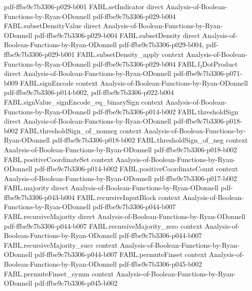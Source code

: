 \begin{theorem}
  {pdf-ffbe9c7b3306-p029-b001}
\proofstep
  {FABL.setIndicator}
  {direct}
  {Analysis-of-Boolean-Functions-by-Ryan-ODonnell}
  {pdf-ffbe9c7b3306-p029-b004}
\proofstep
  {FABL.subsetDensityValue}
  {direct}
  {Analysis-of-Boolean-Functions-by-Ryan-ODonnell}
  {pdf-ffbe9c7b3306-p029-b004}
\proofstep
  {FABL.subsetDensity}
  {direct}
  {Analysis-of-Boolean-Functions-by-Ryan-ODonnell}
  {pdf-ffbe9c7b3306-p029-b004,
    pdf-ffbe9c7b3306-p029-b001}
\proofstep
  {FABL.subsetDensity_apply}
  {context}
  {Analysis-of-Boolean-Functions-by-Ryan-ODonnell}
  {pdf-ffbe9c7b3306-p029-b004}
\proofstep
  {FABL.f₂DotProduct}
  {direct}
  {Analysis-of-Boolean-Functions-by-Ryan-ODonnell}
  {pdf-ffbe9c7b3306-p071-b009}
\proofstep
  {FABL.signEncode}
  {context}
  {Analysis-of-Boolean-Functions-by-Ryan-ODonnell}
  {pdf-ffbe9c7b3306-p014-b002,
    pdf-ffbe9c7b3306-p022-b004}
\proofstep
  {FABL.signValue_signEncode_eq_binarySign}
  {context}
  {Analysis-of-Boolean-Functions-by-Ryan-ODonnell}
  {pdf-ffbe9c7b3306-p014-b002}
\proofstep
  {FABL.thresholdSign}
  {direct}
  {Analysis-of-Boolean-Functions-by-Ryan-ODonnell}
  {pdf-ffbe9c7b3306-p018-b002}
\proofstep
  {FABL.thresholdSign_of_nonneg}
  {context}
  {Analysis-of-Boolean-Functions-by-Ryan-ODonnell}
  {pdf-ffbe9c7b3306-p018-b002}
\proofstep
  {FABL.thresholdSign_of_neg}
  {context}
  {Analysis-of-Boolean-Functions-by-Ryan-ODonnell}
  {pdf-ffbe9c7b3306-p018-b002}
\proofstep
  {FABL.positiveCoordinateSet}
  {context}
  {Analysis-of-Boolean-Functions-by-Ryan-ODonnell}
  {pdf-ffbe9c7b3306-p014-b002}
\proofstep
  {FABL.positiveCoordinateCount}
  {context}
  {Analysis-of-Boolean-Functions-by-Ryan-ODonnell}
  {pdf-ffbe9c7b3306-p017-b002}
\proofstep
  {FABL.majority}
  {direct}
  {Analysis-of-Boolean-Functions-by-Ryan-ODonnell}
  {pdf-ffbe9c7b3306-p043-b004}
\proofstep
  {FABL.recursiveInputBlock}
  {context}
  {Analysis-of-Boolean-Functions-by-Ryan-ODonnell}
  {pdf-ffbe9c7b3306-p044-b007}
\proofstep
  {FABL.recursiveMajority}
  {direct}
  {Analysis-of-Boolean-Functions-by-Ryan-ODonnell}
  {pdf-ffbe9c7b3306-p044-b007}
\proofstep
  {FABL.recursiveMajority_zero}
  {context}
  {Analysis-of-Boolean-Functions-by-Ryan-ODonnell}
  {pdf-ffbe9c7b3306-p044-b007}
\proofstep
  {FABL.recursiveMajority_succ}
  {context}
  {Analysis-of-Boolean-Functions-by-Ryan-ODonnell}
  {pdf-ffbe9c7b3306-p044-b007}
\proofstep
  {FABL.permuteFinset}
  {context}
  {Analysis-of-Boolean-Functions-by-Ryan-ODonnell}
  {pdf-ffbe9c7b3306-p045-b002}
\proofstep
  {FABL.permuteFinset_symm}
  {context}
  {Analysis-of-Boolean-Functions-by-Ryan-ODonnell}
  {pdf-ffbe9c7b3306-p045-b002}

\end{theorem}
